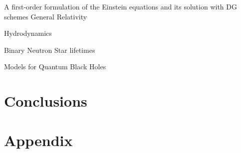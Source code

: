 \subtitledChapter
   {A first-order formulation of the Einstein equations and its solution with DG schemes}
   {General Relativity}\label{chapter:gr}



   {Hydrodynamics}\label{chapter:hydro}



   {Binary Neutron Star lifetimes}\label{chapter:bnslt}


   {Models for Quantum Black Holes}\label{chapter:qgr}


\chapter{Conclusions}\label{chapter:conclusions}


\appendix
\let\thesection\theOldSection %
\makeatletter
\renewcommand\thesection{\thechapter\@arabic\c@section} %
\makeatother
\chapter{Appendix}\label{chapter:appendix}









\begin{fullwidth} %
\newpage%
{}
\end{fullwidth}

\newpage






